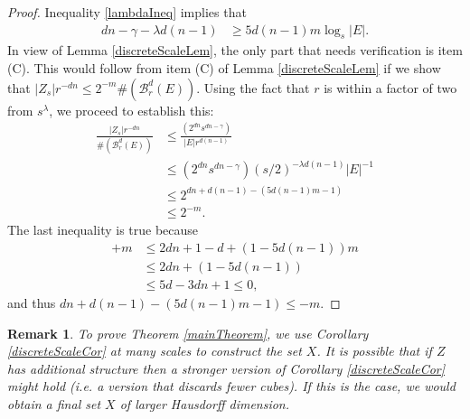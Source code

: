 \documentclass[usenames,dvipsnames,letterpaper, reqno,11pt]{article}
\theoremstyle{plain}
\theoremstyle{plain}
\newtheorem*{remark}{Remark}
\begin{document}
\begin{proof}
	Inequality \ref{lambdaIneq} implies that
	\begin{align*}
		dn - \gamma - \lambda d(n-1) &\geq 5d(n-1) m \log_s |E|.
	\end{align*}
	In view of Lemma \ref{discreteScaleLem}, the only part that needs verification is item (C). This would follow from item (C) of Lemma  \ref{discreteScaleLem} if we show that $|Z_s| r^{-dn} \leq 2^{-m} \#(\mathcal B_r^d(E))$. Using the fact that $r$ is within a factor of two from $s^\lambda$, we proceed to establish this:
	\begin{align*}
\frac{|Z_s|r^{-dn}}{\#(\mathcal B_r^d(E))} & \leq \frac{(2^{dn} s^{dn - \gamma})}{|E| r^{d(n-1)}}\\
		&\leq (2^{dn} s^{dn - \gamma}) (s/2)^{- \lambda d(n-1)} |E|^{-1} \\
		& \leq 2^{dn + d(n-1) - (5d(n-1)m - 1)} \\
		&\leq 2^{-m}.
	\end{align*}
	The last inequality is true because
	\begin{align*}
		[dn + d(n-1) - (5d(n-1)m - 1)] + m	&\leq 2dn + 1 - d + (1 - 5d(n-1)) m\\
		&\leq 2dn + (1 - 5d(n-1))\\
		&\leq 5d-3dn + 1 \leq 0,
	\end{align*}
	and thus $dn + d(n-1) - (5d(n-1)m - 1) \leq -m$.
\end{proof}

\begin{remark}
	To prove Theorem \ref{mainTheorem}, we use Corollary \ref{discreteScaleCor} at many scales to construct the set $X$. It is possible that if $Z$ has additional structure then a stronger version of Corollary \ref{discreteScaleCor} might hold (i.e. a version that discards fewer cubes). If this is the case, we would obtain a final set $X$ of larger Hausdorff dimension. 


\end{remark}
\end{document}
